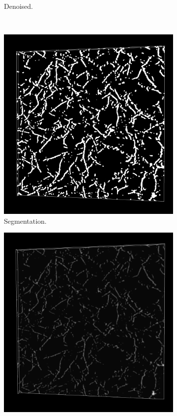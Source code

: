 \begin{figure}[H]
\begin{subfigure}{0.5\textwidth}
    \caption{Denoised.}
    \label{fig:carra_denoised}
  \end{subfigure}\\[1ex]
  \begin{subfigure}{0.5\textwidth}
    \centering
    \includegraphics[width=0.9\linewidth]{Figures/chapter-image/pipeline_screenshots/carra_segmented_tile1.png}
    \caption{Segmentation.}
    \label{fig:carra_segmentation}
  \end{subfigure}%
  \begin{subfigure}{0.5\textwidth}
    \centering
    \includegraphics[width=0.9\linewidth]{Figures/chapter-image/pipeline_screenshots/carra_dmap_tile1.png}

\end{subfigure}
\end{figure}
